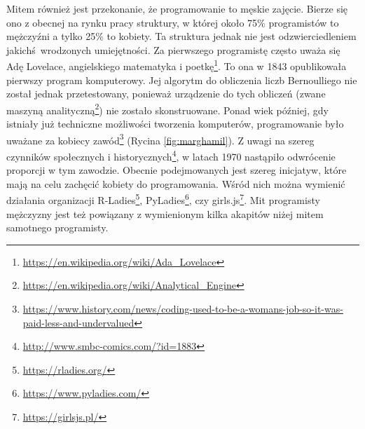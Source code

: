 \documentclass[paper=6in:9in,pagesize=pdftex,headinclude=on,footinclude=on,10pt]{scrbook}
\DeclareRobustCommand{\href}[2]{#2\footnote{\url{#1}}}
\begin{document}
Mitem również jest przekonanie, że programowanie to męskie zajęcie.
Bierze się ono z obecnej na rynku pracy struktury, w której około 75\% programistów to mężczyźni a tylko 25\% to kobiety.
Ta struktura jednak nie jest odzwierciedleniem jakichś~wrodzonych umiejętności.
Za pierwszego programistę często uważa się Adę Lovelace, angielskiego matematyka i poetkę\footnote{\url{https://en.wikipedia.org/wiki/Ada_Lovelace}}.
To ona w 1843 opublikowała pierwszy program komputerowy.
Jej algorytm do obliczenia liczb Bernoulliego nie został jednak przetestowany, ponieważ urządzenie do tych obliczeń (zwane maszyną analityczną\footnote{\url{https://en.wikipedia.org/wiki/Analytical_Engine}}) nie zostało skonstruowane.
Ponad wiek później, gdy istniały już techniczne możliwości tworzenia komputerów, programowanie było uważane za kobiecy zawód\footnote{\url{https://www.history.com/news/coding-used-to-be-a-womans-job-so-it-was-paid-less-and-undervalued}} (Rycina \ref{fig:marghamil}).
Z uwagi na szereg czynników społecznych i historycznych\footnote{\url{http://www.smbc-comics.com/?id=1883}}, w latach 1970 nastąpiło odwrócenie proporcji w tym zawodzie.
Obecnie podejmowanych jest szereg inicjatyw, które mają na celu zachęcić kobiety do programowania.
Wśród nich można wymienić działania organizacji \href{https://rladies.org/}{R-Ladies}, \href{https://www.pyladies.com/}{PyLadies}, czy \href{https://girlsjs.pl/}{girls.js}.
Mit programisty mężczyzny jest też powiązany z wymienionym kilka akapitów niżej mitem samotnego programisty.
\end{document}
